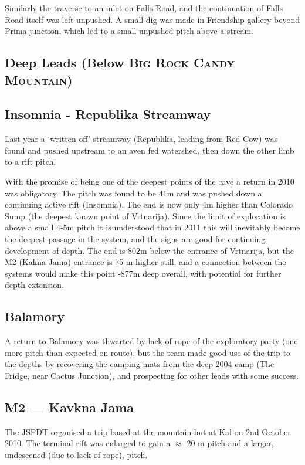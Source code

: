 Similarly the traverse to an inlet on Falls Road, and the continuation
of Falls Road itself was left unpushed. A small dig was made in Friendship
gallery beyond Prima junction, which led to a small unpushed pitch
above a stream.

\subsection{Deep Leads (Below \textsc{Big Rock Candy Mountain})}

\subsection{Insomnia - Republika Streamway}

Last year a `written off' streamway (Republika, leading from Red Cow)
was found and pushed upstream to an aven fed watershed, then down
the other limb to a rift pitch.

With the promise of being one of the deepest points of the cave a
return in 2010 was obligatory. The pitch was found to be 41m and was
pushed down a continuing active rift (Insomnia). The end is now only
4m higher than Colorado Sump (the deepest known point of Vrtnarija).
Since the limit of exploration is above a small 4-5m pitch it is understood
that in 2011 this will inevitably become the deepest passage in the
system, and the signs are good for continuing development of depth.
The end is 802m below the entrance of Vrtnarija, but the M2 (Kakna
Jama) entrance is 75 m higher still, and a connection between the
systems would make this point -877m deep overall, with potential for
further depth extension.


\subsection{Balamory}

A return to Balamory was thwarted by lack of rope of the exploratory
party (one more pitch than expected on route), but the team made good
use of the trip to the depths by recovering the camping mats from
the deep 2004 camp (The Fridge, near Cactus Junction), and prospecting for
other leads with some success.

\subsection{M2 --- Kavkna Jama}

The JSPDT organised a trip based at the mountain hut at Kal on 2nd October
2010. The terminal rift was enlarged to gain a $\approx$ 20 m pitch and a
larger, undescened (due to lack of rope), pitch. 

